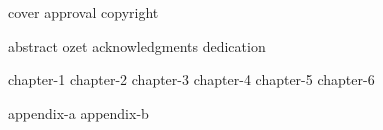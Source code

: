 \documentclass[12pt, oneside, a4paper]{report}
\begin{document}
 
    {cover}
    {approval}
    {copyright}

    \clearpage {} \setcounter{page}{3}
    {abstract}
    {ozet}
    {acknowledgments}
    {dedication}

    \tableofcontents
    \listoffigures
    \listoftables
    \listofalgorithms

    \clearpage {} \setcounter{page}{1} \onehalfspacing
    {chapter-1}
    {chapter-2}
    {chapter-3}
    {chapter-4}
    {chapter-5}
    {chapter-6}

    \singlespace
    \printbibliography

    \onehalfspacing
    \begin{appendices}
        {appendix-a}
        {appendix-b}
    \end{appendices}
\end{document}
